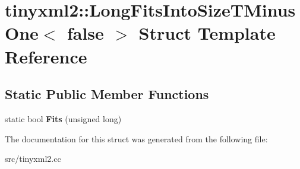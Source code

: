 \hypertarget{structtinyxml2_1_1LongFitsIntoSizeTMinusOne_3_01false_01_4}{}\section{tinyxml2\+:\+:Long\+Fits\+Into\+Size\+T\+Minus\+One$<$ false $>$ Struct Template Reference}
\label{structtinyxml2_1_1LongFitsIntoSizeTMinusOne_3_01false_01_4}
\subsection*{Static Public Member Functions}
\begin{DoxyCompactItemize}
\item 
static bool {\bfseries Fits} (unsigned long)\hypertarget{structtinyxml2_1_1LongFitsIntoSizeTMinusOne_3_01false_01_4_a29b01087f38a951276df69d358dc0764}{}\label{structtinyxml2_1_1LongFitsIntoSizeTMinusOne_3_01false_01_4_a29b01087f38a951276df69d358dc0764}

\end{DoxyCompactItemize}


The documentation for this struct was generated from the following file\+:\begin{DoxyCompactItemize}
\item 
src/tinyxml2.\+cc\end{DoxyCompactItemize}
